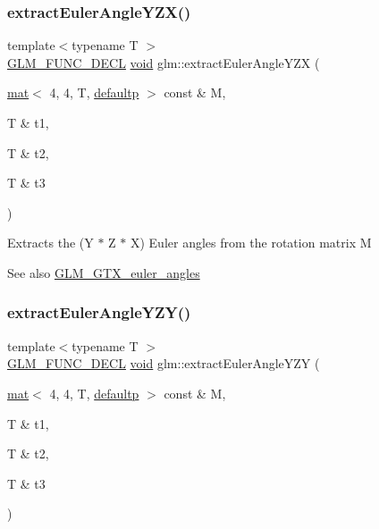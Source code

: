 \subsubsection{\texorpdfstring{extract\+Euler\+Angle\+Y\+Z\+X()}{extractEulerAngleYZX()}}
{\footnotesize\ttfamily template$<$typename T $>$ \\
\mbox{\hyperlink{setup_8hpp_ab2d052de21a70539923e9bcbf6e83a51}{G\+L\+M\+\_\+\+F\+U\+N\+C\+\_\+\+D\+E\+CL}} \mbox{\hyperlink{_s_d_l__opengles2__gl2ext_8h_ae5d8fa23ad07c48bb609509eae494c95}{void}} glm\+::extract\+Euler\+Angle\+Y\+ZX (\begin{DoxyParamCaption}\item[{\mbox{\hyperlink{structglm_1_1mat}{mat}}$<$ 4, 4, T, \mbox{\hyperlink{namespaceglm_a36ed105b07c7746804d7fdc7cc90ff25a9d21ccd8b5a009ec7eb7677befc3bf51}{defaultp}} $>$ const \&}]{M,  }\item[{T \&}]{t1,  }\item[{T \&}]{t2,  }\item[{T \&}]{t3 }\end{DoxyParamCaption})}

Extracts the (Y $\ast$ Z $\ast$ X) Euler angles from the rotation matrix M \begin{DoxySeeAlso}{See also}
\mbox{\hyperlink{group__gtx__euler__angles}{G\+L\+M\+\_\+\+G\+T\+X\+\_\+euler\+\_\+angles}} 
\end{DoxySeeAlso}
\mbox{\label{group__gtx__euler__angles_ga11dad972c109e4bf8694c915017c44a6}} 
\subsubsection{\texorpdfstring{extract\+Euler\+Angle\+Y\+Z\+Y()}{extractEulerAngleYZY()}}
{\footnotesize\ttfamily template$<$typename T $>$ \\
\mbox{\hyperlink{setup_8hpp_ab2d052de21a70539923e9bcbf6e83a51}{G\+L\+M\+\_\+\+F\+U\+N\+C\+\_\+\+D\+E\+CL}} \mbox{\hyperlink{_s_d_l__opengles2__gl2ext_8h_ae5d8fa23ad07c48bb609509eae494c95}{void}} glm\+::extract\+Euler\+Angle\+Y\+ZY (\begin{DoxyParamCaption}\item[{\mbox{\hyperlink{structglm_1_1mat}{mat}}$<$ 4, 4, T, \mbox{\hyperlink{namespaceglm_a36ed105b07c7746804d7fdc7cc90ff25a9d21ccd8b5a009ec7eb7677befc3bf51}{defaultp}} $>$ const \&}]{M,  }\item[{T \&}]{t1,  }\item[{T \&}]{t2,  }\item[{T \&}]{t3 }\end{DoxyParamCaption})}

